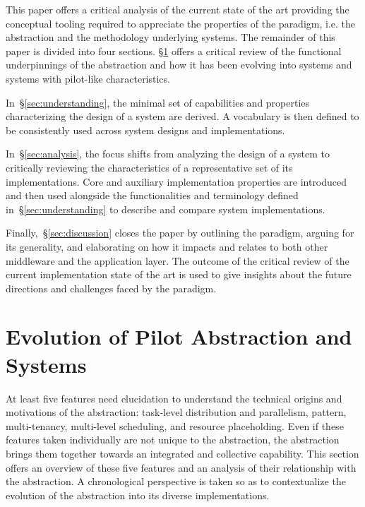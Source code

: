 \documentclass{sig-alternate}
\begin{document}
This paper offers a critical analysis of the current state of the art providing
the conceptual tooling required to appreciate the properties of the \pilot
paradigm, i.e. the abstraction and the methodology underlying \pilotjobs
systems. The remainder of this paper is divided into four sections.
\S\ref{sec:history} offers a critical review of the functional underpinnings of
the \pilot abstraction and how it has been evolving into \pilotjob systems and
systems with pilot-like characteristics.

In~\S\ref{sec:understanding}, the minimal set of capabilities and properties
characterizing the design of a \pilotjob system are derived. A vocabulary is
then defined to be consistently used across
\pilotjob system designs and implementations.

In~\S\ref{sec:analysis}, the focus shifts from analyzing the design of a
\pilotjob system to critically reviewing the characteristics of a representative
set of its implementations. Core and auxiliary implementation properties are
introduced and then used alongside the functionalities and terminology defined
in~\S\ref{sec:understanding} to describe and compare \pilotjob system
implementations.

Finally,~\S\ref{sec:discussion} closes the paper by outlining the \pilot
paradigm, arguing for its generality, and elaborating on how it impacts and
relates to both other middleware and the application layer. The outcome of the
critical review of the current implementation state of the art is used to give
insights about the future directions and challenges faced by the \pilot
paradigm.


%
\section{Evolution of Pilot Abstraction and Systems}
\label{sec:history}


At least five features need elucidation to understand the technical origins and
motivations of the \pilot abstraction: task-level distribution and parallelism,
\MW pattern, multi-tenancy, multi-level scheduling, and resource placeholding.
Even if these features taken individually are not unique to the \pilot
abstraction, the \pilot abstraction brings them together towards an integrated
and collective capability. This section offers an overview of these five
features and an analysis of their relationship with the \pilot abstraction. A
chronological perspective is taken so as to contextualize the evolution of the
\pilot abstraction into its diverse implementations.
\end{document}
